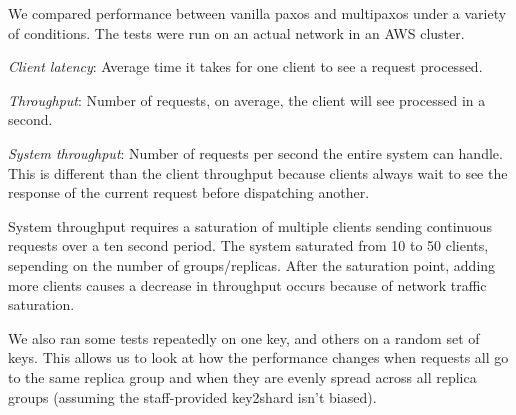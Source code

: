 \documentclass[letterpaper,10pt]{article}
\begin{document}
We compared performance between vanilla paxos and multipaxos under a
variety of conditions. The tests were run on an actual network in an
AWS cluster. 

\textit{Client latency}: Average time it takes for one client to see a
request processed. 

\textit{Throughput}: Number of requests, on average, the
client will see processed in a second.

\textit{System throughput}: Number of requests per second the entire
system can handle. This is different than the client throughput
because clients always wait to see the response of the current request
before dispatching another.

System throughput requires a saturation of multiple clients sending
continuous requests over a ten second period. The system saturated
from 10 to 50 clients, sepending on the number of
groups/replicas. After the saturation point, adding more clients
causes a decrease in throughput occurs because of network traffic
saturation.

We also ran some tests repeatedly on one key, and others on a random
set of keys. This allows us to look at how the performance changes
when requests all go to the same replica group and when they are
evenly spread across all replica groups (assuming the staff-provided
key2shard isn't biased).
\end{document}
